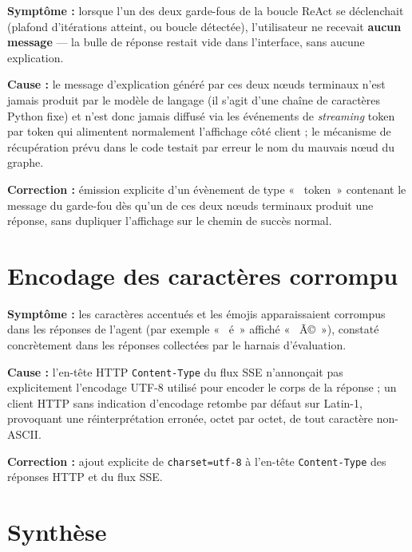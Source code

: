 \documentclass[11pt,a4paper]{report}
\begin{document}
\textbf{Symptôme :} lorsque l'un des deux garde-fous de la boucle
ReAct se déclenchait (plafond d'itérations atteint, ou boucle
détectée), l'utilisateur ne recevait \textbf{aucun message} — la bulle
de réponse restait vide dans l'interface, sans aucune explication.

\textbf{Cause :} le message d'explication généré par ces deux nœuds
terminaux n'est jamais produit par le modèle de langage (il s'agit
d'une chaîne de caractères Python fixe) et n'est donc jamais diffusé
via les événements de \textit{streaming} token par token qui
alimentent normalement l'affichage côté client ; le mécanisme de
récupération prévu dans le code testait par erreur le nom du mauvais
nœud du graphe.

\textbf{Correction :} émission explicite d'un évènement de type
«  token » contenant le message du garde-fou dès qu'un de ces deux
nœuds terminaux produit une réponse, sans dupliquer l'affichage sur le
chemin de succès normal.

\section{Encodage des caractères corrompu}

\textbf{Symptôme :} les caractères accentués et les émojis
apparaissaient corrompus dans les réponses de l'agent (par exemple
«  é » affiché «  Ã© »), constaté concrètement dans les
réponses collectées par le harnais d'évaluation.

\textbf{Cause :} l'en-tête HTTP \texttt{Content-Type} du flux SSE
n'annonçait pas explicitement l'encodage UTF-8 utilisé pour encoder le
corps de la réponse ; un client HTTP sans indication d'encodage
retombe par défaut sur Latin-1, provoquant une réinterprétation
erronée, octet par octet, de tout caractère non-ASCII.

\textbf{Correction :} ajout explicite de \texttt{charset=utf-8} à
l'en-tête \texttt{Content-Type} des réponses HTTP et du flux SSE.

\section{Synthèse}
\end{document}
